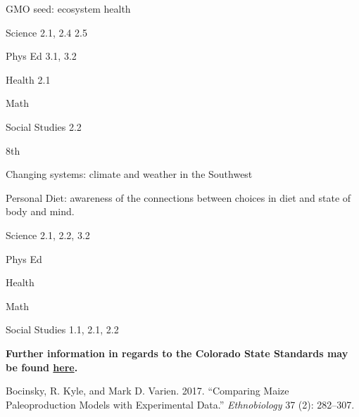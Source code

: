 \documentclass[12pt,]{article}
\begin{document}
GMO seed: ecosystem health

Science 2.1, 2.4 2.5

Phys Ed 3.1, 3.2

Health 2.1

Math

Social Studies 2.2

8th

Changing systems: climate and weather in the Southwest

Personal Diet: awareness of the connections between choices in diet and state of body and mind.

Science 2.1, 2.2, 3.2

Phys Ed

Health

Math

Social Studies 1.1, 2.1, 2.2

\textbf{Further information in regards to the Colorado State Standards may be found \href{http://www2.cde.state.co.us/scripts/allstandards/COStandards.asp}{here}.}

\hypertarget{refs}{}
\leavevmode\hypertarget{ref-Bocinsky2017}{}%
Bocinsky, R. Kyle, and Mark D. Varien. 2017. ``Comparing Maize Paleoproduction Models with Experimental Data.'' \emph{Ethnobiology} 37 (2): 282--307.
\end{document}
